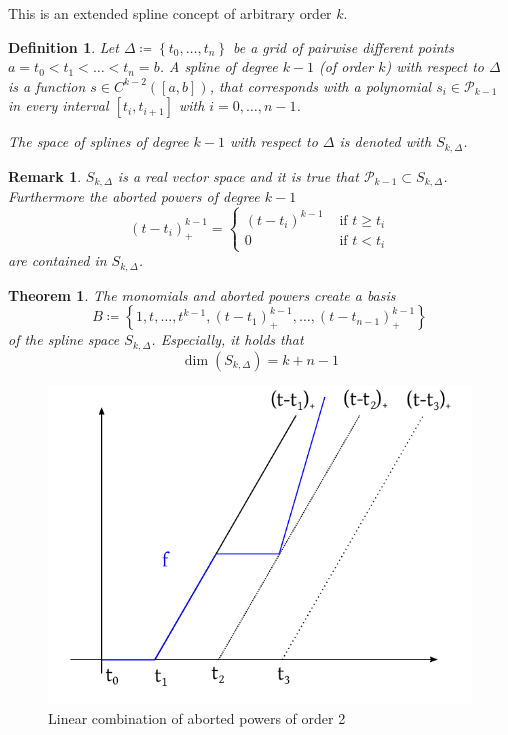 \documentclass[a4paper]{article}
\newcounter{lecref}[section]
\numberwithin{lecref}{section}
\theoremstyle{break}
\newtheorem{thm}[lecref]{Theorem}
\newtheorem*{Definition}{Definition}
\newtheorem*{Remark}{Remark}
\newcommand{\Set}[1]{\left\{#1\right\}}
\begin{document}
This is an extended spline concept of arbitrary order $k$.

\begin{Definition}
  \label{definition:4-19}
  Let $\Delta \coloneqq \Set{t_0, \dots, t_n}$ be a grid of pairwise different points $a = t_0 < t_1 < \dots < t_n = b$.
  A spline of degree $k-1$ (of order $k$) with respect to $\Delta$ is a function $s \in C^{k-2}([a,b])$, that corresponds with a polynomial $s_i \in \mathcal P_{k-1}$ in every interval $[t_i, t_{i+1}]$ with $i = 0, \dots, n-1$.

  The space of splines of degree $k-1$ with respect to $\Delta$ is denoted with $S_{k, \Delta}$.
\end{Definition}

\begin{Remark}
  \label{plus-notation}
  $S_{k,\Delta}$ is a real vector space and it is true that $\mathcal P_{k-1} \subset S_{k,\Delta}$.
  Furthermore the aborted powers of degree $k-1$
  \[
    (t - t_i)_+^{k-1} = \begin{cases}
      (t - t_i)^{k-1} & \text{ if } t \geq t_i \\
      0 & \text{ if } t < t_i
    \end{cases}
  \]
  are contained in $S_{k,\Delta}$.
\end{Remark}

\begin{thm}
  \label{theorem:4-20}
  The monomials and aborted powers create a basis
  \[ B \coloneqq \Set{1, t, \dots, t^{k-1}, (t - t_1)_+^{k-1}, \dots, (t - t_{n-1})_+^{k-1}} \]
  of the spline space $S_{k,\Delta}$. Especially, it holds that
  \[ \dim(S_{k,\Delta}) = k + n - 1 \]
\end{thm}

\begin{figure}[ht]
  \begin{center}
    \includegraphics{img/splines.pdf}
    \caption{Linear combination of aborted powers of order 2}
    \label{img:splines}
  \end{center}
\end{figure}
\end{document}
